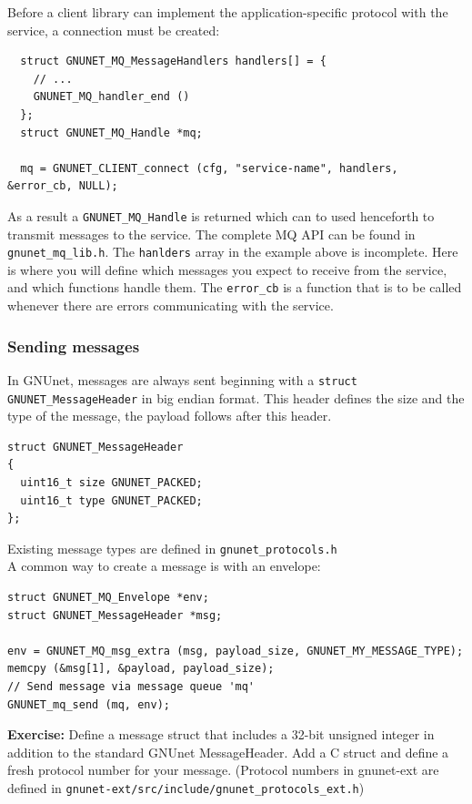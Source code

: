 \documentclass[10pt]{article}
\newcommand{\exercise}[1]{\noindent\begin{boxedminipage}{\textwidth}{\bf Exercise:} #1 \end{boxedminipage}}
\begin{document}
Before a client library can implement the application-specific protocol
with the service, a connection must be created:

\lstset{language=C}
\begin{lstlisting}
  struct GNUNET_MQ_MessageHandlers handlers[] = {
    // ...
    GNUNET_MQ_handler_end ()
  };
  struct GNUNET_MQ_Handle *mq;

  mq = GNUNET_CLIENT_connect (cfg, "service-name", handlers, &error_cb, NULL);
\end{lstlisting}

As a result a {\tt GNUNET\_MQ\_Handle} is returned
which can to used henceforth to transmit messages to
the service.
The complete MQ API can be found in {\tt gnunet\_mq\_lib.h}.
The {\tt hanlders} array in the example above is incomplete.
Here is where you will define which messages you expect to
receive from the service, and which functions handle them.
The {\tt error\_cb} is a function that is to be called whenever
there are errors communicating with the service.

\subsubsection{Sending messages}

In GNUnet, messages are always sent beginning with a {\tt struct GNUNET\_MessageHeader}
in big endian format. This header defines the size and the type of the
message, the payload follows after this header.

\lstset{language=C}
\begin{lstlisting}
struct GNUNET_MessageHeader
{
  uint16_t size GNUNET_PACKED;
  uint16_t type GNUNET_PACKED;
};
\end{lstlisting}

Existing message types are defined in {\tt gnunet\_protocols.h}\\
A common way to create a message is with an envelope:

\lstset{language=C}
\begin{lstlisting}
struct GNUNET_MQ_Envelope *env;
struct GNUNET_MessageHeader *msg;

env = GNUNET_MQ_msg_extra (msg, payload_size, GNUNET_MY_MESSAGE_TYPE);
memcpy (&msg[1], &payload, payload_size);
// Send message via message queue 'mq'
GNUNET_mq_send (mq, env);
\end{lstlisting}

\exercise{Define a message struct that includes a 32-bit
unsigned integer in addition to the standard GNUnet MessageHeader.
Add a C struct and define a fresh protocol number for your message.
(Protocol numbers in gnunet-ext are defined in \lstinline|gnunet-ext/src/include/gnunet_protocols_ext.h|)}
\end{document}

